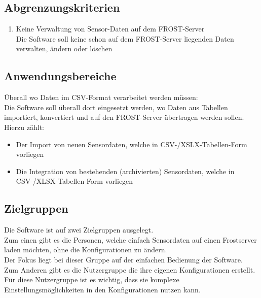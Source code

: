 \documentclass[12 pt]{article}
\begin{document}
	\subsection{Abgrenzungskriterien}
	\begin{enumerate}
		\item Keine Verwaltung von Sensor-Daten auf dem FROST-Server \\
		Die Software soll keine schon auf dem FROST-Server liegenden Daten verwalten, ändern oder löschen
	\end{enumerate}
	
	
	\subsection{Anwendungsbereiche}
	Überall wo Daten im CSV-Format verarbeitet werden müssen: \\
	Die Software soll überall dort eingesetzt werden, wo Daten aus Tabellen importiert, konvertiert und auf den FROST-Server übertragen werden sollen. \\
	Hierzu zählt:
	\begin{itemize}
		\item Der Import von neuen Sensordaten, welche in CSV-/XSLX-Tabellen-Form vorliegen
		\item Die Integration von bestehenden (archivierten) Sensordaten, welche in CSV-/XLSX-Tabellen-Form vorliegen
	\end{itemize}
	
	\subsection{Zielgruppen}
	Die Software ist auf zwei Zielgruppen ausgelegt.\\
	Zum einen gibt es die Personen, welche einfach Sensordaten auf einen Frostserver laden möchten,  ohne die Konfigurationen zu ändern. \\Der Fokus liegt bei dieser Gruppe auf der einfachen Bedienung der Software.\\
	Zum Anderen gibt es die Nutzergruppe die ihre eigenen Konfigurationen erstellt. Für diese Nutzergruppe ist es wichtig, dass sie komplexe Einstellungsmöglichkeiten in den Konfigurationen nutzen kann.
	
\end{document}
